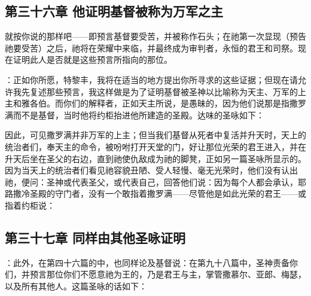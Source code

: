 \subsection{第三十六章 他证明基督被称为万军之主}

就按你说的那样吧——即预言基督要受苦，并被称作石头；在祂第一次显现（预告祂要受苦）之后，祂将在荣耀中来临，并最终成为审判者，永恒的君王和司祭。现在证明此人是否就是这些预言所指向的那位。\par

：正如你所愿，特黎丰，我将在适当的地方提出你所寻求的这些证据；但现在请允许我先复述那些预言，我这样做是为了证明基督被圣神以比喻称为天主、万军的上主和雅各伯。而你们的解释者，正如天主所说，是愚昧的，因为他们说那是指撒罗满而不是基督，当时他将约柜抬进他所建造的圣殿。达味的圣咏如下：\par

\par

因此，可见撒罗满并非万军的上主；但当我们基督从死者中复活并升天时，天上的统治者们，奉天主的命令，被吩咐打开天堂的门，好让那位光荣的君王进入，并在升天后坐在圣父的右边，直到祂使仇敌成为祂的脚凳，正如另一篇圣咏所显示的。因为当天上的统治者们看见祂容貌丑陋、受人轻慢、毫无光荣时，他们没有认出祂，便问：圣神或代表圣父，或代表自己，回答他们说：因为每个人都会承认，耶路撒冷圣殿的守门者，没有一个敢指着撒罗满——尽管他是如此光荣的君王——或指着约柜说：\par


\subsection{第三十七章  同样由其他圣咏证明}

：此外，在第四十六篇的中，也同样论及基督说：在第九十八篇中，圣神责备你们，并预言那位你们不愿意祂为王的，乃是君王与主，掌管撒慕尔、亚郎、梅瑟，以及所有其他人。这篇圣咏的话如下：\par

